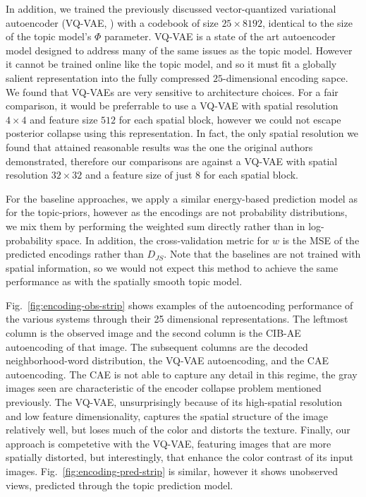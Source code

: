 In addition, we trained the previously discussed vector-quantized variational autoencoder (VQ-VAE, \citep{vqvae2017}) with a codebook of size $25 \times 8192$, identical to the size of the topic model's $\Phi$ parameter. VQ-VAE is a state of the art autoencoder model designed to address many of the same issues as the topic model. However it cannot be trained online like the topic model, and so it must fit a globally salient representation into the fully compressed $25$-dimensional encoding sapce. We found that VQ-VAEs are very sensitive to architecture choices. For a fair comparison, it would be preferrable to use a VQ-VAE with spatial resolution $4 \times 4$ and feature size $512$ for each spatial block, however we could not escape posterior collapse using this representation. In fact, the only spatial resolution we found that attained reasonable results was the one the original authors demonstrated, therefore our comparisons are against a VQ-VAE with spatial resolution $32 \times 32$ and a feature size of just $8$ for each spatial block.

For the baseline approaches, we apply a similar energy-based prediction model as for the topic-priors, however as the encodings are not probability distributions, we mix them by performing the weighted sum directly rather than in log-probability space. In addition, the cross-validation metric for $w$ is the MSE of the predicted encodings rather than $D_{JS}$. Note that the baselines are not trained with spatial information, so we would not expect this method to achieve the same performance as with the spatially smooth topic model.

Fig.~\ref{fig:encoding-obs-strip} shows examples of the autoencoding performance of the various systems through their 25 dimensional representations. The leftmost column is the observed image and the second column is the CIB-AE autoencoding of that image. The subsequent columns are the decoded neighborhood-word distribution, the VQ-VAE autoencoding, and the CAE autoencoding. The CAE is not able to capture any detail in this regime, the gray images seen are characteristic of the encoder collapse problem mentioned previously. The VQ-VAE, unsurprisingly because of its high-spatial resolution and low feature dimensionality, captures the spatial structure of the image relatively well, but loses much of the color and distorts the texture. Finally, our approach is competetive with the VQ-VAE, featuring images that are more spatially distorted, but interestingly, that enhance the color contrast of its input images. Fig.~\ref{fig:encoding-pred-strip} is similar, however it shows unobserved views, predicted through the topic prediction model.

